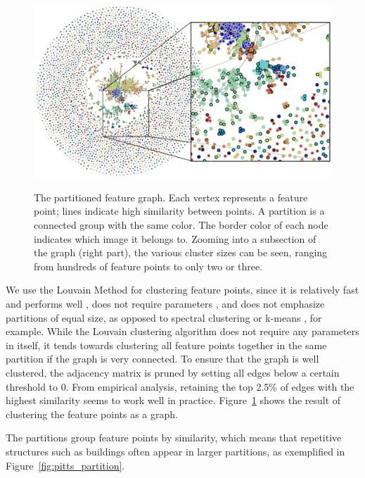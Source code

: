 \begin{figure}[t]
    \centering
	\includegraphics[width=\textwidth]{images/MMC_graph}
    \label{fig:graph}
	\caption{The partitioned feature graph. Each vertex represents a 
		feature point; lines indicate high similarity between points. A 
		partition is a connected group with the same color. The border 
		color of each node indicates which image it belongs to.  Zooming 
	into a subsection of the graph (right part), the various cluster 
sizes can be seen, ranging from hundreds of feature points to only two 
or three.}
	\label{fig:graph}
\end{figure}

We use the Louvain Method \cite{blondel2008} for clustering feature 
points, since it is relatively fast and performs well 
\cite{lancichinetti2009}, does not require parameters 
\cite{blondel2008}, and does not emphasize partitions of equal size, as 
opposed to spectral clustering or k-means \cite{von2007}, for example.
While the Louvain clustering algorithm does not require any parameters 
in itself, it tends towards clustering all feature points together in 
the same partition if the graph is very connected.  To ensure that the 
graph is well clustered, the adjacency matrix is pruned by setting all 
edges below a certain threshold to $0$.  From empirical analysis, 
retaining the top 2.5\% of edges with the highest similarity seems to 
work well in practice.  Figure~\ref{fig:graph} shows the result of 
clustering the feature points as a graph.

The partitions group feature points by similarity, which means that 
repetitive structures such as buildings often appear in larger 
partitions, as exemplified in Figure~\ref{fig:pitts_partition}.

